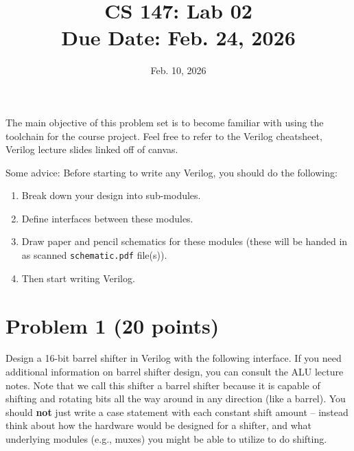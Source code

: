 \documentclass[12pt]{article}
\title{CS 147: Lab 02 \\ Due Date: Feb. 24, 2026}
\author{}
\date{Feb. 10, 2026}
\begin{document}
\maketitle
The main objective of this problem set is to become familiar with using the toolchain for the course project.  
Feel free to refer
to the Verilog cheatsheet, Verilog lecture slides linked off of canvas. 

Some advice: Before starting to write any Verilog, you should do the following:
\begin{enumerate}
\item
Break down your design into sub-modules.
\item Define interfaces between these modules.
\item Draw paper and pencil schematics for these modules (these will be handed in as scanned
\texttt{schematic.pdf} file(s)).
\item Then start writing Verilog.
\end{enumerate}

\section*{Problem 1 (20 points)}
Design a 16-bit barrel shifter in Verilog with the following interface. If you need additional information on
barrel shifter design, you can consult the ALU lecture notes. Note that we call this shifter a barrel shifter
because it is capable of shifting and rotating bits all the way around in any direction (like a barrel). You
should \textbf{not} just write a case statement with each constant shift amount – instead think about how the
hardware would be designed for a shifter, and what underlying modules (e.g., muxes) you might be able to
utilize to do shifting. 
\end{document}
